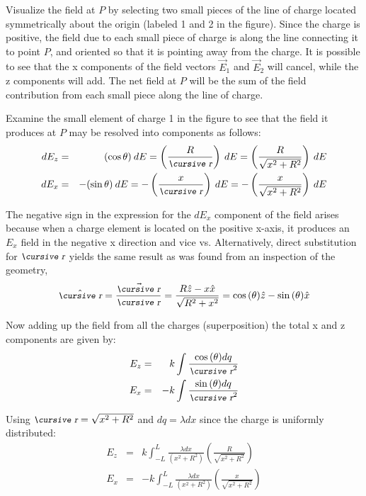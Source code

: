 \documentclass[12pt]{article}
\begin{document}
Visualize the field at $P$ by selecting two small pieces of the line of charge located symmetrically about the origin (labeled 1 and 2 in the figure).  Since the charge is positive, the field due to each small piece of charge is along the line connecting it to point $P$, and oriented so that it is pointing away from the charge.  It is possible to see that the x components of the field vectors $\vec{E}_{1}$ and $\vec{E}_{2}$ will cancel, while the z components will add.  The net field at $P$ will be the sum of the field contribution from each small piece along the line of charge.  

Examine the small element of charge 1 in the figure to see that the field it 
produces at $P$ may be resolved into components as follows:
\begin{eqnarray*}
dE_{z} & = & (\cos{\theta}) \: dE =  \left( \frac{R}{\text{\small\slshape\cursive r}} \right) \: dE 
= \left( \frac{R}{\sqrt{x^{2}+R^{2}}} \right) \: dE\\
dE_{x} & = & -(\sin{\theta}) \: dE = -\left( \frac{x}{\text{\small\slshape\cursive r}} \right) \: dE = 
-\left( \frac{x}{\sqrt{x^{2}+R^{2}}} \right) \: dE
\end{eqnarray*}

The negative sign in the expression for the $dE_{x}$ component of the field arises because when a charge element is located on the positive x-axis, it produces an $E_{x}$ field in the negative x direction and vice vs.  Alternatively, direct substitution for $\text{\small\slshape\cursive r}$ yields the same result as was found from an inspection of the geometry, 
\[
\hat{\text{\small\slshape\cursive r}}=\frac{\vec{\text{\small\slshape\cursive r}}}{\text{\small\slshape\cursive r}} = \frac{R\hat{z}-x\hat{x}}{\sqrt{  R^{2} + x^{2} } } = \cos{(\theta)}\hat{z} - \sin{(\theta)}\hat{x}
\]

Now adding up the field from all the charges (superposition) the total x and z components are given by:
\begin{eqnarray*}
E_{z} & = & k\int \frac{ \cos{(\theta)}dq }{ \text{\small\slshape\cursive r}^{2} } \\
E_{x} & = & -k\int \frac{\sin{(\theta)}dq}{\text{\small\slshape\cursive r}^{2} }
\end{eqnarray*}

Using $\text{\small\slshape\cursive r}=\sqrt{x^{2}+R^{2}}$ and $dq=\lambda dx$ since the charge is uniformly distributed:
\begin{eqnarray*}
E_{z} & = & k\int_{-L}^{L} \frac{\lambda dx}{(x^{2}+R^{2})}
\left( \frac{R}{\sqrt{x^{2}+R^{2}}} \right)  \\
E_{x} & = & -k\int_{-L}^{L} \frac{\lambda dx}{(x^{2}+R^{2})}
\left( \frac{x}{\sqrt{x^{2}+R^{2}}} \right)
\end{eqnarray*}
\end{document}
